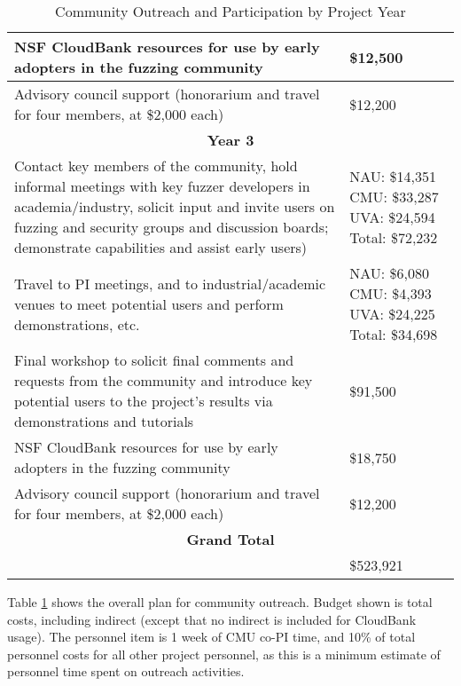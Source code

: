 \documentclass[12pt]{article}
\begin{document}
\begin{table}
\begin{tabular}{|p{12cm}|p{3cm}|}
    \hline
    NSF CloudBank resources for use by early adopters in the fuzzing 
    community & \$12,500 \\
    \hline 
    Advisory council support (honorarium and travel for four members, 
    at \$2,000 each) & \$12,200 \\    
    \hline
    \hline
    \multicolumn{2}{c}{{\bf Year 3}} \\
    \hline
    \hline
   Contact key members of the community, hold informal meetings with
    key fuzzer developers in academia/industry, solicit input and
    invite users
    on fuzzing and security groups and discussion boards; demonstrate
    capabilities and assist early users) &  NAU:  \$14,351 CMU: \$33,287 UVA: \$24,594
                                                      Total: \$72,232 \\
    \hline
    Travel to PI meetings, and to industrial/academic venues to meet
    potential users and perform demonstrations, etc. & NAU: \$6,080 CMU: \$4,393 UVA:  \$24,225 Total: \$34,698\\
    \hline    
    Final workshop to solicit final comments and requests from the
    community and introduce key potential users to the project’s
    results via demonstrations and tutorials & \$91,500 \\
    \hline
    NSF CloudBank resources for use by early adopters in the fuzzing 
    community & \$18,750 \\
    \hline 
    Advisory council support (honorarium and travel for four members, 
    at \$2,000 each) & \$12,200 \\    
    \hline
    \hline
    \multicolumn{2}{c}{{\bf Grand Total}} \\
    \hline
                   &     \$523,921 \\
                     \hline
 
  \end{tabular}
  \caption{Community Outreach and Participation by Project Year}
  \label{tab:outreach}
  
\end{table}


Table \ref{tab:outreach} shows the overall plan for community
outreach.   Budget shown is total costs, including indirect (except
that no indirect is included for CloudBank usage).   The personnel item is 1 week of CMU co-PI time, and 10\%
of total personnel costs for all other project personnel, as this is a
minimum estimate of personnel time spent on outreach activities.
\end{document}
